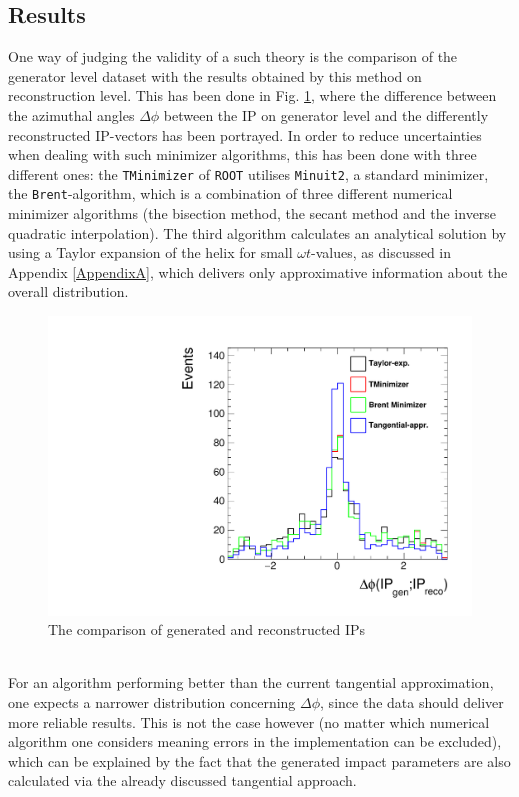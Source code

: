 \subsection{Results}
One way of judging the validity of a such theory is the comparison of the generator level dataset with the results obtained by this method on reconstruction level. This has been done in Fig. \ref{fig:deltaphinocut}, where the difference between the azimuthal angles $\Delta\phi$ between the IP on generator level and the differently reconstructed IP-vectors has been portrayed. In order to reduce uncertainties when dealing with such minimizer algorithms, this has been done with three different ones: the \verb|TMinimizer| of \verb|ROOT| utilises \verb|Minuit2|, a standard minimizer, the \verb|Brent|-algorithm, which is a combination of three different numerical minimizer algorithms (the bisection method, the secant method and the inverse quadratic interpolation). The third algorithm calculates an analytical solution by using a Taylor expansion of the helix for small $\omega t$-values, as discussed in Appendix \ref{AppendixA}, which delivers only approximative information about the overall distribution.
\begin{figure}[h]
	\centering
	\includegraphics[width=0.7\linewidth]{Figures/deltaPhi_nocut}
	\caption{The comparison of generated and reconstructed IPs}
	\label{fig:deltaphinocut}
\end{figure}\\
For an algorithm performing better than the current tangential approximation, one expects a narrower distribution concerning $\Delta\phi$, since the data should deliver more reliable results. This is not the case however (no matter which numerical algorithm one considers meaning errors in the implementation can be excluded), which can be explained by the fact that the generated impact parameters are also calculated via the already discussed tangential approach.\\
